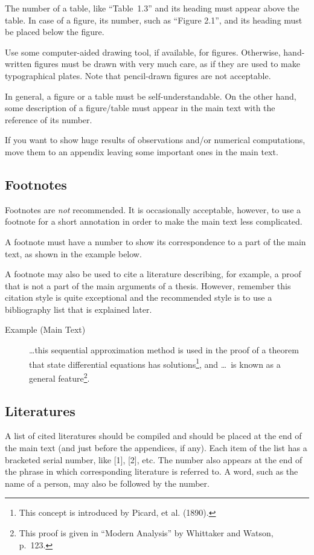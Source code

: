 \documentclass[master,english]{kuisthesis}
\begin{document}
The number of a table, like ``Table~1.3'' and its heading must appear above
the table.  In case of a figure, its number, such as ``Figure 2.1'', and its
heading must be placed below the figure.

Use some computer-aided drawing tool, if available, for figures.  Otherwise,
hand-written figures must be drawn with very much care, as if they are used
to make typographical plates.  Note that pencil-drawn figures are not
acceptable.

In general, a figure or a table must be self-understandable.  On the other
hand, some description of a figure/table must appear in the main text with
the reference of its number.

If you want to show huge results of observations and/or numerical
computations, move them to an appendix leaving some important ones in the
main text.

\subsection{Footnotes}\label{subsec-footnote}
Footnotes are {\em not} recommended.  It is occasionally acceptable,
however, to use a footnote for a short annotation in order to make the main
text less complicated.

A footnote must have a number to show its correspondence to a part of the
main text, as shown in the example below.

A footnote may also be used to cite a literature describing, for example, a
proof that is not a part of the main arguments of a thesis.  However,
remember this citation style is quite exceptional and the recommended style
is to use a bibliography list that is explained later.

\begin{description}
\item[Example {\rm(Main Text)}]\leavevmode\par
\ldots this sequential approximation method is used in the proof of a theorem
that state differential equations has solutions\footnote{This concept is
introduced by Picard, et al. (1890).}, and \ldots\ is known as a general
feature\footnote{This proof is given in ``Modern Analysis'' by Whittaker and
Watson, p.~123.}.
\end{description}

\subsection{Literatures}\label{subsec-references}
A list of cited literatures should be compiled and should be placed at the 
end of the main text (and just before the appendices, if any).  Each item of
the list has a bracketed serial number, like [1], [2], etc. 
The number also appears at the end of the phrase in which
corresponding literature is referred to. A word, such as the name of a person,
may also be followed by the number.
\end{document}
